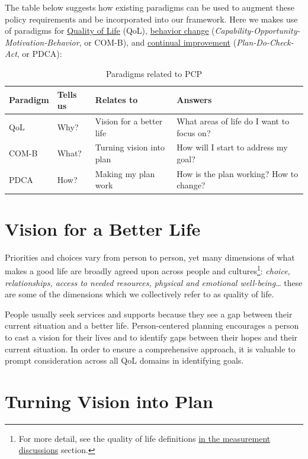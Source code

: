 \documentclass[
]{book}
\begin{document}
The table below suggests how existing paradigms can be used to augment these policy requirements and be incorporated into our framework. Here we makes use of paradigms for \protect\hyperlink{qol_intro}{Quality of Life} (QoL), \protect\hyperlink{comb_intro}{behavior change} (\emph{Capability-Opportunity-Motivation-Behavior}, or COM-B), and \protect\hyperlink{pdca_intro}{continual improvement} (\emph{Plan-Do-Check-Act}, or PDCA):

\begin{table}

\caption{\label{tab:unnamed-chunk-3}Paradigms related to PCP}
\centering
\begin{tabular}[t]{l|l|l|l}
\hline
Paradigm & Tells us & Relates to & Answers\\
\hline
QoL & Why? & Vision for a better life & What areas of life do I want to focus on?\\
\hline
COM-B & What? & Turning vision into plan & How will I start to address my goal?\\
\hline
PDCA & How? & Making my plan work & How is the plan working? How to change?\\
\hline
\end{tabular}
\end{table}

\hypertarget{qol_intro}{%
\section{Vision for a Better Life}\label{qol_intro}}

Priorities and choices vary from person to person, yet many dimensions of what makes a good life are broadly agreed upon across people and cultures\footnote{For more detail, see the quality of life definitions \protect\hyperlink{qol_def}{in the measurement discussions} section.}: \emph{choice, relationships, access to needed resources, physical and emotional well-being}\ldots{} these are some of the dimensions which we collectively refer to as quality of life.

People usually seek services and supports because they see a gap between their current situation and a better life. Person-centered planning encourages a person to cast a vision for their lives and to identify gaps between their hopes and their current situation. In order to ensure a comprehensive approach, it is valuable to prompt consideration across all QoL domains in identifying goals.

\hypertarget{comb_intro}{%
\section{Turning Vision into Plan}\label{comb_intro}}
\end{document}
